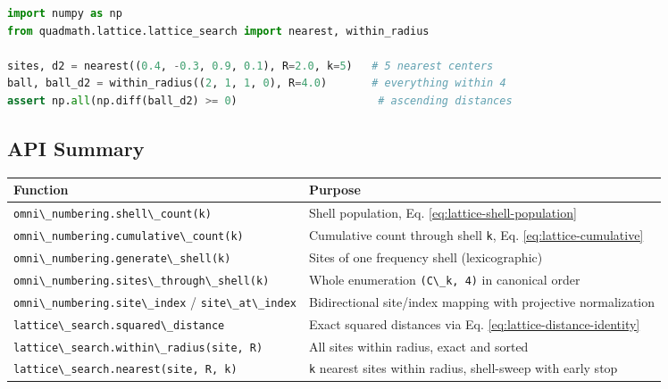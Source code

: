 \documentclass[
  10pt,
]{article}
\newcommand{\passthrough}[1]{#1}
\newcounter{none} %
\begin{document}
\begin{lstlisting}[language=Python]
import numpy as np
from quadmath.lattice.lattice_search import nearest, within_radius

sites, d2 = nearest((0.4, -0.3, 0.9, 0.1), R=2.0, k=5)   # 5 nearest centers
ball, ball_d2 = within_radius((2, 1, 1, 0), R=4.0)       # everything within 4
assert np.all(np.diff(ball_d2) >= 0)                      # ascending distances
\end{lstlisting}

\subsection{API Summary}\label{api-summary}

{\def\LTcaptype{none} %
\begin{longtable}[]{@{}
  >{\raggedright\arraybackslash}p{}
  >{\raggedright\arraybackslash}p{}@{}}
\toprule\noalign{}
\begin{minipage}[b]{\linewidth}\raggedright
Function
\end{minipage} & \begin{minipage}[b]{\linewidth}\raggedright
Purpose
\end{minipage} \\
\midrule\noalign{}
\endhead
\bottomrule\noalign{}
\endlastfoot
\passthrough{\lstinline!omni\_numbering.shell\_count(k)!} & Shell
population, Eq. \eqref{eq:lattice-shell-population} \\
\passthrough{\lstinline!omni\_numbering.cumulative\_count(k)!} &
Cumulative count through shell \passthrough{\lstinline!k!}, Eq.
\eqref{eq:lattice-cumulative} \\
\passthrough{\lstinline!omni\_numbering.generate\_shell(k)!} & Sites of
one frequency shell (lexicographic) \\
\passthrough{\lstinline!omni\_numbering.sites\_through\_shell(k)!} &
Whole enumeration \passthrough{\lstinline!(C\_k, 4)!} in canonical
order \\
\passthrough{\lstinline!omni\_numbering.site\_index!} /
\passthrough{\lstinline!site\_at\_index!} & Bidirectional site/index
mapping with projective normalization \\
\passthrough{\lstinline!lattice\_search.squared\_distance!} & Exact
squared distances via Eq. \eqref{eq:lattice-distance-identity} \\
\passthrough{\lstinline!lattice\_search.within\_radius(site, R)!} & All
sites within radius, exact and sorted \\
\passthrough{\lstinline!lattice\_search.nearest(site, R, k)!} &
\passthrough{\lstinline!k!} nearest sites within radius, shell-sweep
with early stop \\
\end{longtable}
}
\end{document}
